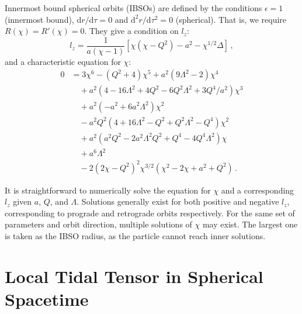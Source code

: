 \documentclass[11pt, twocolumn]{article}
\begin{document}
Innermost bound spherical orbits (IBSOs) are defined by the conditions $\epsilon = 1$ (innermost bound), $\mathrm{d}r/\mathrm{d}\tau = 0$ and $\mathrm{d}^{2}r/\mathrm{d}\tau^{2} = 0$ (spherical). That is, we require $R(\chi) = R'(\chi) = 0$. They give a condition on $l_{z}$:
\begin{equation}
    l_{z} = \frac{1}{a(\chi - 1)} \left[ \chi (\chi - Q^{2}) - a^{2} - \chi^{1/2} \Delta \right] \, ,
\end{equation}
and a characteristic equation for $\chi$:
\begin{equation} \label{eq:ibso_kn}
    \begin{split}
        0 &= 3\chi^{6} - (Q^{2} + 4) \chi^{5} + a^{2}(9\Lambda^{2} - 2) \chi^{4} \\
        &\quad+ a^{2} \left( 4 - 16\Lambda^{2} + 4Q^{2} - 6Q^{2}\Lambda^{2} + 3Q^{4}/a^{2} \right) \chi^{3} \\
        &\quad+ a^{2} \left( -a^{2} + 6a^{2} \Lambda^{2} \right) \chi^{2} \\
        &\quad- a^{2} Q^{2} \left( 4 + 16\Lambda^{2} - Q^{2} + Q^{2} \Lambda^{2} - Q^{4} \right) \chi^{2} \\
        &\quad+ a^{2} \left( a^{2} Q^{2} - 2a^{2} \Lambda^{2} Q^{2} + Q^{4} - 4Q^{4} \Lambda^{2} \right) \chi \\
        &\quad+ a^{6} \Lambda^{2} \\
        &\quad- 2 (2\chi - Q^{2})^{2} \chi^{3/2} (\chi^{2} - 2\chi + a^{2} + Q^{2}) \, .
    \end{split}
\end{equation}

It is straightforward to numerically solve the equation for $\chi$ and a corresponding $l_{z}$ given $a$, $Q$, and $\Lambda$. Solutions generally exist for both positive and negative $l_{z}$, corresponding to prograde and retrograde orbits respectively. For the same set of parameters and orbit direction, multiple solutions of $\chi$ may exist. The largest one is taken as the IBSO radius, as the particle cannot reach inner solutions.


\section{Local Tidal Tensor in Spherical Spacetime}
\end{document}
